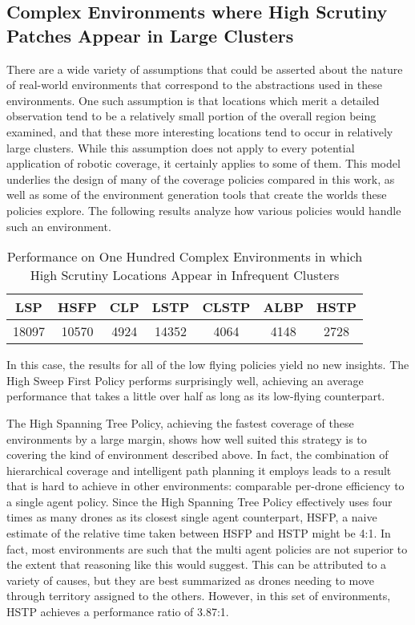 \subsection{Complex Environments where High Scrutiny Patches Appear in Large Clusters}

There are a wide variety of assumptions that could be asserted about the nature of real-world environments that correspond to the abstractions used in these environments. One such assumption is that locations which merit a detailed observation tend to be a relatively small portion of the overall region being examined, and that these more interesting locations tend to occur in relatively large clusters. While this assumption does not apply to every potential application of robotic coverage, it certainly applies to some of them. This model underlies the design of many of the coverage policies compared in this work, as well as some of the environment generation tools that create the worlds these policies explore. The following results analyze how various policies would handle such an environment.

\begin{table}[h]
\begin{center}
 \begin{tabular}{||c c c c c c c ||}
 \hline
 LSP   & HSFP  & CLP  & LSTP  & CLSTP & ALBP & HSTP \\
 \hline
 18097 & 10570  & 4924 & 14352 & 4064  & 4148 & 2728 \\
 \hline
 \end{tabular}
\end{center}
\caption{Performance on One Hundred Complex Environments in which High Scrutiny Locations Appear in Infrequent Clusters}
\end{table}

In this case, the results for all of the low flying policies yield no new insights. The High Sweep First Policy performs surprisingly well, achieving an average performance that takes a little over half as long as its low-flying counterpart.

The High Spanning Tree Policy, achieving the fastest coverage of these environments by a large margin, shows how well suited this strategy is to covering the kind of environment described above. In fact, the combination of hierarchical coverage and intelligent path planning it employs leads to a result that is hard to achieve in other environments: comparable per-drone efficiency to a single agent policy. Since the High Spanning Tree Policy effectively uses four times as many drones as its closest single agent counterpart, HSFP, a naive estimate of the relative time taken between HSFP and HSTP might be 4:1. In fact, most environments are such that the multi agent policies are not superior to the extent that reasoning like this would suggest. This can be attributed to a variety of causes, but they are best summarized as drones needing to move through territory assigned to the others. However, in this set of environments, HSTP achieves a performance ratio of 3.87:1.

